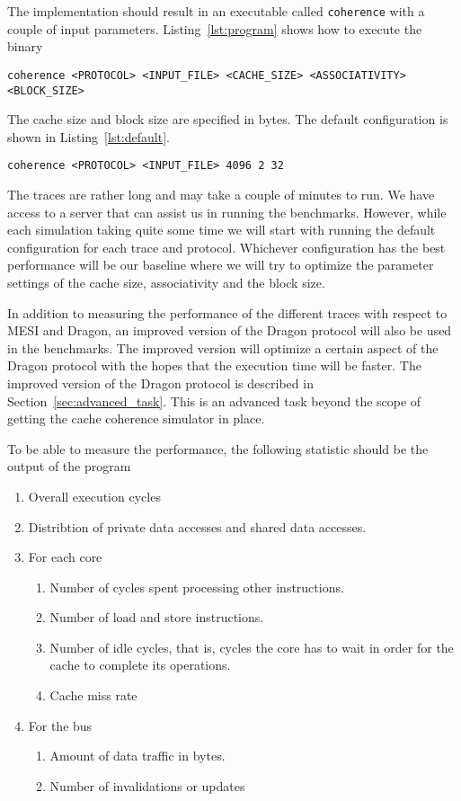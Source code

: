 The implementation should result in an executable called \texttt{coherence} with a couple of input parameters. Listing~\ref{lst:program} shows how to execute the binary
\begin{lstlisting}[label=lst:program]
coherence <PROTOCOL> <INPUT_FILE> <CACHE_SIZE> <ASSOCIATIVITY> <BLOCK_SIZE>
\end{lstlisting}
The cache size and block size are specified in bytes.
The default configuration is shown in Listing~\ref{lst:default}.
\begin{lstlisting}[label=lst:default]
coherence <PROTOCOL> <INPUT_FILE> 4096 2 32
\end{lstlisting}
The traces are rather long and may take a couple of minutes to run.
We have access to a server that can assist us in running the benchmarks.
However, while each simulation taking quite some time we will start with running the default configuration for each trace and protocol.
Whichever configuration has the best performance will be our baseline where we will try to optimize the parameter settings of the cache size, associativity and the block size.

In addition to measuring the performance of the different traces with respect to MESI and Dragon, an improved version of the Dragon protocol will also be used in the benchmarks.
The improved version will optimize a certain aspect of the Dragon protocol with the hopes that the execution time will be faster.
The improved version of the Dragon protocol is described in Section~\ref{sec:advanced_task}.
This is an advanced task beyond the scope of getting the cache coherence simulator in place.

To be able to measure the performance, the following statistic should be the output of the program
\begin{enumerate}
    \item Overall execution cycles
    \item Distribtion of private data accesses and shared data accesses.
    \item For each core
          \begin{enumerate}
              \item Number of cycles spent processing other instructions.
              \item Number of load and store instructions.
              \item Number of idle cycles, that is, cycles the core has to wait in order for the cache to complete its operations.
              \item Cache miss rate
          \end{enumerate}
    \item For the bus
          \begin{enumerate}
              \item Amount of data traffic in bytes.
              \item Number of invalidations or updates
          \end{enumerate}
\end{enumerate}



